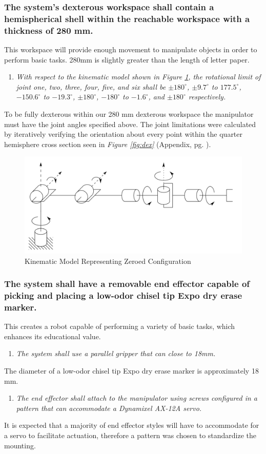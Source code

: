 \documentclass[12pt]{report}
\begin{document}
\subsubsection{The system’s dexterous workspace shall contain a hemispherical shell within the reachable workspace with a thickness of 280 mm.}
This workspace will provide enough movement to manipulate objects in order to perform basic tasks. 280mm is slightly greater than the length of letter paper.
\begin{enumerate}
  \item \textit{With respect to the kinematic model shown in Figure \ref{fig:zero}, the rotational limit of joint one, two, three, four, five, and six shall be \(\pm180^{\circ}\), \(\pm9.7^{\circ}\) to \(177.5^{\circ}\), \(-150.6^{\circ}\) to \(-19.3^{\circ}\), \(\pm180^{\circ}\), \(-180^{\circ}\) to \(-1.6^{\circ}\), and \(\pm180^{\circ}\) respectively.}
\end{enumerate}
To be fully dexterous within our 280 mm dexterous workspace the manipulator must have the joint angles specified above. The joint limitations were calculated by iteratively verifying the orientation about every point within the quarter hemisphere cross section seen in \emph{Figure \ref{fig:dex}} (Appendix, pg. \pageref{sec:app}).
  \begin{figure}[htp]
    \centering
    \includegraphics[width=.75\textwidth]{zero}
    \caption[Kinematic Model Representing Zeroed Configuration]{Kinematic Model Representing Zeroed Configuration \cite{robo}}
    \label{fig:zero}
  \end{figure}
\subsubsection{The system shall have a removable end effector capable of picking and placing a low-odor chisel tip Expo dry erase marker.}
This creates a robot capable of performing a variety of basic tasks, which enhances its educational value.
\begin{enumerate}
  \item \textit{The system shall use a parallel gripper that can close to 18mm.}
\end{enumerate}
The diameter of a low-odor chisel tip Expo dry erase marker is approximately 18 mm.
\begin{enumerate}[resume]
  \item \textit{The end effector shall attach to the manipulator using screws configured in a pattern that can accommodate a Dynamixel AX-12A servo.}
\end{enumerate}
It is expected that a majority of end effector styles will have to accommodate for a servo to facilitate actuation, therefore a pattern was chosen to standardize the mounting.
\end{document}
